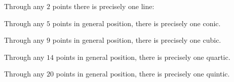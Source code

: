 \begin{example}
Through any \(2\) points there is precisely one line: 
\end{example}
\begin{example}
Through any \(5\) points in general position, there is precisely one conic.
\end{example}
\begin{example}
Through any \(9\) points in general position, there is precisely one cubic.
\end{example}
\begin{example}
Through any \(14\) points in general position, there is precisely one quartic.
\end{example}
\begin{example}
Through any \(20\) points in general position, there is precisely one quintic.
\end{example}

